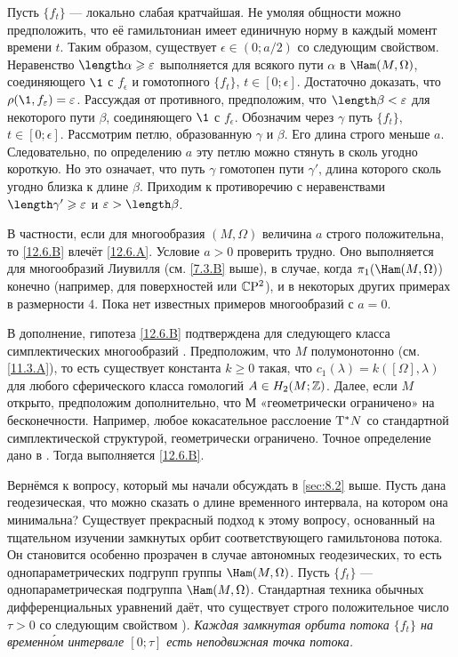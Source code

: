 Пусть $\{f_t\}$ — локально слабая кратчайшая.
Не умоляя общности можно предположить, что её гамильтониан имеет единичную норму в каждый момент времени $t$.
Таким образом, существует $\epsilon \in (0; a/2)$ со следующим свойством.
Неравенство $\length\alpha \ge \epsilon$ выполняется для всякого пути $\alpha$ в $\Ham(M, \Omega)$, соединяющего $\1$ с $f_\epsilon$ и гомотопного $\{f_t\}$, $t\in[0; \epsilon]$.
Достаточно доказать, что $\rho(\1, f_\epsilon) = \epsilon$.
Рассуждая от противного, предположим, что $\length \beta < \epsilon$ для некоторого пути $\beta$, соединяющего $\1$ с $f_\epsilon$.
Обозначим через $\gamma$ путь $\{f_t\}$, $t\in[0; \epsilon]$.
Рассмотрим петлю, образованную $\gamma$ и $\beta$.
Его длина строго меньше $a$.
Следовательно, по определению $a$ эту петлю можно стянуть в сколь угодно короткую.
Но это означает, что путь $\gamma$ гомотопен пути $\gamma'$, длина которого сколь угодно близка к длине $\beta$.
Приходим к противоречию с неравенствами $\length \gamma' \ge\epsilon$ и $\epsilon > \length \beta$.
\qeds

В частности, если для многообразия $(M,\Omega)$ величина $a$ строго положительна, то \ref{12.6.B} влечёт \ref{12.6.A}.
Условие $a > 0$ проверить трудно.
Оно выполняется для многообразий Лиувилля (см. \ref{7.3.B} выше), в случае, когда $\pi_1(\Ham(M, \Omega)$) конечно (например, для поверхностей или $\mathbb{C}\mathrm{P}^2$), и в некоторых других примерах в размерности 4.
Пока нет известных примеров многообразий с $a = 0$.

В дополнение, гипотеза \ref{12.6.B} подтверждена для следующего класса симплектических многообразий \cite{LM2}.
Предположим, что $M$ полумонотонно (см. \ref{11.3.A}), то есть существует константа $k \ge 0$ такая, что $c_1(\lambda) = k([\Omega],\lambda)$ для любого сферического класса гомологий $A \in H_2 (M;\mathbb{Z})$.
Далее, если $M$ открыто, предположим дополнительно, что $М$ «геометрически ограничено» на бесконечности.
Например, любое кокасательное расслоение $\mathrm{T}^\ast N$ со стандартной симплектической структурой, геометрически ограничено.
Точное определение дано в \cite{AL}.
Тогда выполняется \ref{12.6.B}.

Вернёмся к вопросу, который мы начали обсуждать в \ref{sec:8.2} выше.
Пусть дана геодезическая, что можно сказать о длине временного интервала, на котором она минимальна?
Существует прекрасный подход к этому вопросу, основанный на тщательном изучении замкнутых орбит соответствующего гамильтонова потока.
Он становится особенно прозрачен в случае автономных геодезических, то есть однопараметрических подгрупп группы $\Ham(M, \Omega)$.
Пусть $\{f_t\}$ — однопараметрическая подгруппа $\Ham(M, \Omega)$.
Стандартная техника обычных дифференциальных уравнений даёт, что существует строго положительное число $\tau > 0$ со следующим свойством \cite[Sec. 5.7]{HZ}).
\emph{Каждая замкнутая орбита потока $\{f_t\}$ на временн\'{о}м интервале $[0; \tau]$ есть неподвижная точка потока.}

